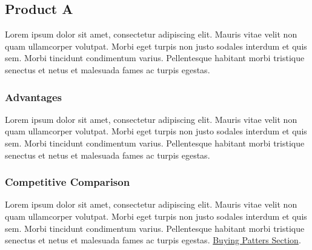 \documentclass[11pt,titlepage]{article}
\begin{document}
\subsection{Product A}
Lorem ipsum dolor sit amet, consectetur adipiscing elit. Mauris vitae velit 
non quam ullamcorper volutpat. Morbi eget turpis non justo sodales interdum 
et quis sem. Morbi tincidunt condimentum varius. Pellentesque habitant morbi 
tristique senectus et netus et malesuada fames ac turpis egestas.\newline

\subsubsection{Advantages}
Lorem ipsum dolor sit amet, consectetur adipiscing elit. Mauris vitae velit 
non quam ullamcorper volutpat. Morbi eget turpis non justo sodales interdum 
et quis sem. Morbi tincidunt condimentum varius. Pellentesque habitant morbi 
tristique senectus et netus et malesuada fames ac turpis egestas.\newline

\subsubsection{Competitive Comparison}
Lorem ipsum dolor sit amet, consectetur adipiscing elit. Mauris vitae velit 
non quam ullamcorper volutpat. Morbi eget turpis non justo sodales interdum 
et quis sem. Morbi tincidunt condimentum varius. Pellentesque habitant morbi 
tristique senectus et netus et malesuada fames ac turpis egestas.\newline
\hyperlink{competition_and_buying_patterns}{Buying Patters Section}.\newline\newline
\end{document}
